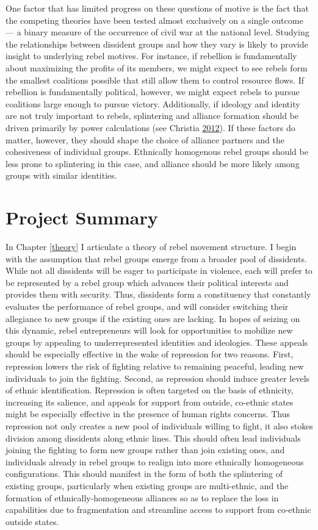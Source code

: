 \documentclass[12pt,]{book}
\theoremstyle{definition}
\theoremstyle{definition}
\theoremstyle{remark}
\begin{document}
One factor that has limited progress on these questions of motive is the
fact that the competing theories have been tested almost exclusively on
a single outcome --- a binary measure of the occurrence of civil war at
the national level. Studying the relationships between dissident groups
and how they vary is likely to provide insight to underlying rebel
motives. For instance, if rebellion is fundamentally about maximizing
the profits of its members, we might expect to see rebels form the
smallest coalitions possible that still allow them to control resource
flows. If rebellion is fundamentally political, however, we might expect
rebels to pursue coalitions large enough to pursue victory.
Additionally, if ideology and identity are not truly important to
rebels, splintering and alliance formation should be driven primarily by
power calculations (see Christia
\protect\hyperlink{ref-Christia2012}{2012}). If these factors do matter,
however, they should shape the choice of alliance partners and the
cohesiveness of individual groups. Ethnically homogenous rebel groups
should be less prone to splintering in this case, and alliance should be
more likely among groups with similar identities.

\section{Project Summary}\label{project-summary}

In Chapter \ref{theory} I articulate a theory of rebel movement
structure. I begin with the assumption that rebel groups emerge from a
broader pool of dissidents. While not all dissidents will be eager to
participate in violence, each will prefer to be represented by a rebel
group which advances their political interests and provides them with
security. Thus, dissidents form a constituency that constantly evaluates
the performance of rebel groups, and will consider switching their
allegiance to new groups if the existing ones are lacking. In hopes of
seizing on this dynamic, rebel entrepreneurs will look for opportunities
to mobilize new groups by appealing to underrepresented identities and
ideologies. These appeals should be especially effective in the wake of
repression for two reasons. First, repression lowers the risk of
fighting relative to remaining peaceful, leading new individuals to join
the fighting. Second, as repression should induce greater levels of
ethnic identification. Repression is often targeted on the basis of
ethnicity, increasing its salience, and appeals for support from
outside, co-ethnic states might be especially effective in the presence
of human rights concerns. Thus repression not only creates a new pool of
individuals willing to fight, it also stokes division among dissidents
along ethnic lines. This should often lead individuals joining the
fighting to form new groups rather than join existing ones, and
individuals already in rebel groups to realign into more ethnically
homogeneous configurations. This should manifest in the form of both the
splintering of existing groups, particularly when existing groups are
multi-ethnic, and the formation of ethnically-homogeneous alliances so
as to replace the loss in capabilities due to fragmentation and
streamline access to support from co-ethnic outside states.
\end{document}
